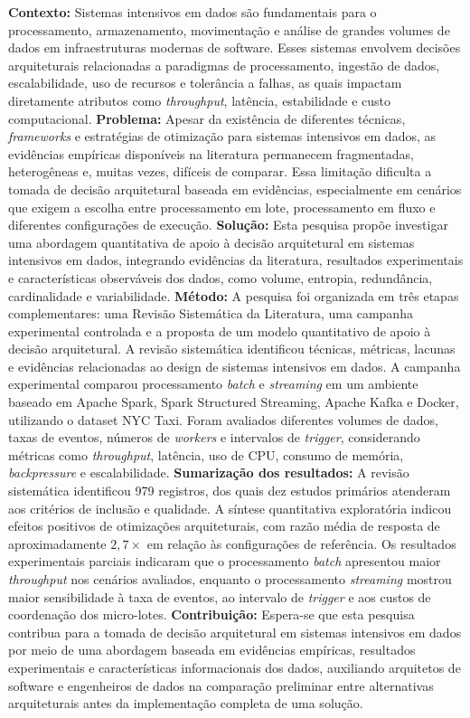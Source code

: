 \setlength{\absparsep}{18pt}

\begin{resumo}
\textbf{Contexto:} Sistemas intensivos em dados são fundamentais para o processamento, armazenamento, movimentação e análise de grandes volumes de dados em infraestruturas modernas de software. Esses sistemas envolvem decisões arquiteturais relacionadas a paradigmas de processamento, ingestão de dados, escalabilidade, uso de recursos e tolerância a falhas, as quais impactam diretamente atributos como \textit{throughput}, latência, estabilidade e custo computacional. \textbf{Problema:} Apesar da existência de diferentes técnicas, \textit{frameworks} e estratégias de otimização para sistemas intensivos em dados, as evidências empíricas disponíveis na literatura permanecem fragmentadas, heterogêneas e, muitas vezes, difíceis de comparar. Essa limitação dificulta a tomada de decisão arquitetural baseada em evidências, especialmente em cenários que exigem a escolha entre processamento em lote, processamento em fluxo e diferentes configurações de execução. \textbf{Solução:} Esta pesquisa propõe investigar uma abordagem quantitativa de apoio à decisão arquitetural em sistemas intensivos em dados, integrando evidências da literatura, resultados experimentais e características observáveis dos dados, como volume, entropia, redundância, cardinalidade e variabilidade. \textbf{Método:} A pesquisa foi organizada em três etapas complementares: uma Revisão Sistemática da Literatura, uma campanha experimental controlada e a proposta de um modelo quantitativo de apoio à decisão arquitetural. A revisão sistemática identificou técnicas, métricas, lacunas e evidências relacionadas ao design de sistemas intensivos em dados. A campanha experimental comparou processamento \textit{batch} e \textit{streaming} em um ambiente baseado em Apache Spark, Spark Structured Streaming, Apache Kafka e Docker, utilizando o dataset NYC Taxi. Foram avaliados diferentes volumes de dados, taxas de eventos, números de \textit{workers} e intervalos de \textit{trigger}, considerando métricas como \textit{throughput}, latência, uso de CPU, consumo de memória, \textit{backpressure} e escalabilidade. \textbf{Sumarização dos resultados:} A revisão sistemática identificou 979 registros, dos quais dez estudos primários atenderam aos critérios de inclusão e qualidade. A síntese quantitativa exploratória indicou efeitos positivos de otimizações arquiteturais, com razão média de resposta de aproximadamente $2{,}7\times$ em relação às configurações de referência. Os resultados experimentais parciais indicaram que o processamento \textit{batch} apresentou maior \textit{throughput} nos cenários avaliados, enquanto o processamento \textit{streaming} mostrou maior sensibilidade à taxa de eventos, ao intervalo de \textit{trigger} e aos custos de coordenação dos micro-lotes. \textbf{Contribuição:} Espera-se que esta pesquisa contribua para a tomada de decisão arquitetural em sistemas intensivos em dados por meio de uma abordagem baseada em evidências empíricas, resultados experimentais e características informacionais dos dados, auxiliando arquitetos de software e engenheiros de dados na comparação preliminar entre alternativas arquiteturais antes da implementação completa de uma solução.


\end{resumo}
